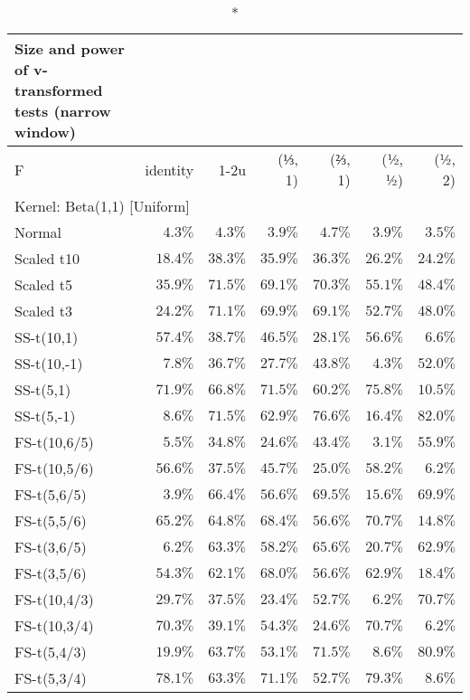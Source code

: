 \setlength{\LTpost}{0mm}
\begin{longtable}{lrrrrrr}
\caption*{
{\large Size and power of v-transformed tests (narrow window)}
} \\ 
\toprule
F & identity & \textbar{}1-2u\textbar{} & (⅓, 1) & (⅔, 1) & (½, ½) & (½, 2) \\ 
\midrule
\multicolumn{7}{l}{Kernel: Beta(1,1) [Uniform]} \\ 
\midrule
Normal & $4.3\%$ & $4.3\%$ & $3.9\%$ & $4.7\%$ & $3.9\%$ & $3.5\%$ \\ 
Scaled t10 & $18.4\%$ & $38.3\%$ & $35.9\%$ & $36.3\%$ & $26.2\%$ & $24.2\%$ \\ 
Scaled t5 & $35.9\%$ & $71.5\%$ & $69.1\%$ & $70.3\%$ & $55.1\%$ & $48.4\%$ \\ 
Scaled t3 & $24.2\%$ & $71.1\%$ & $69.9\%$ & $69.1\%$ & $52.7\%$ & $48.0\%$ \\ 
SS-t(10,1) & $57.4\%$ & $38.7\%$ & $46.5\%$ & $28.1\%$ & $56.6\%$ & $6.6\%$ \\ 
SS-t(10,-1) & $7.8\%$ & $36.7\%$ & $27.7\%$ & $43.8\%$ & $4.3\%$ & $52.0\%$ \\ 
SS-t(5,1) & $71.9\%$ & $66.8\%$ & $71.5\%$ & $60.2\%$ & $75.8\%$ & $10.5\%$ \\ 
SS-t(5,-1) & $8.6\%$ & $71.5\%$ & $62.9\%$ & $76.6\%$ & $16.4\%$ & $82.0\%$ \\ 
FS-t(10,6/5) & $5.5\%$ & $34.8\%$ & $24.6\%$ & $43.4\%$ & $3.1\%$ & $55.9\%$ \\ 
FS-t(10,5/6) & $56.6\%$ & $37.5\%$ & $45.7\%$ & $25.0\%$ & $58.2\%$ & $6.2\%$ \\ 
FS-t(5,6/5) & $3.9\%$ & $66.4\%$ & $56.6\%$ & $69.5\%$ & $15.6\%$ & $69.9\%$ \\ 
FS-t(5,5/6) & $65.2\%$ & $64.8\%$ & $68.4\%$ & $56.6\%$ & $70.7\%$ & $14.8\%$ \\ 
FS-t(3,6/5) & $6.2\%$ & $63.3\%$ & $58.2\%$ & $65.6\%$ & $20.7\%$ & $62.9\%$ \\ 
FS-t(3,5/6) & $54.3\%$ & $62.1\%$ & $68.0\%$ & $56.6\%$ & $62.9\%$ & $18.4\%$ \\ 
FS-t(10,4/3) & $29.7\%$ & $37.5\%$ & $23.4\%$ & $52.7\%$ & $6.2\%$ & $70.7\%$ \\ 
FS-t(10,3/4) & $70.3\%$ & $39.1\%$ & $54.3\%$ & $24.6\%$ & $70.7\%$ & $6.2\%$ \\ 
FS-t(5,4/3) & $19.9\%$ & $63.7\%$ & $53.1\%$ & $71.5\%$ & $8.6\%$ & $80.9\%$ \\ 
FS-t(5,3/4) & $78.1\%$ & $63.3\%$ & $71.1\%$ & $52.7\%$ & $79.3\%$ & $8.6\%$ \\ 

\end{longtable}
